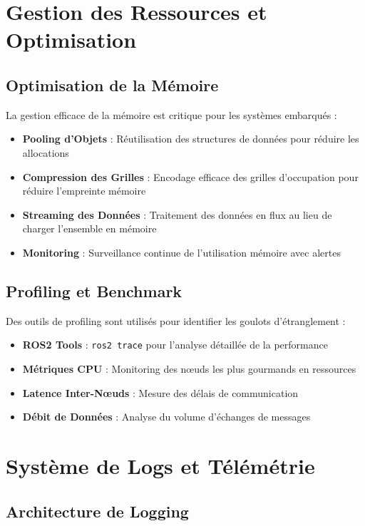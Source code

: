 \documentclass[12pt,a4paper,oneside]{report}
\begin{document}
\section{Gestion des Ressources et Optimisation}

\subsection{Optimisation de la Mémoire}

La gestion efficace de la mémoire est critique pour les systèmes embarqués :

\begin{itemize}
  \item \textbf{Pooling d'Objets} : Réutilisation des structures de données pour réduire les allocations
  \item \textbf{Compression des Grilles} : Encodage efficace des grilles d'occupation pour réduire l'empreinte mémoire
  \item \textbf{Streaming des Données} : Traitement des données en flux au lieu de charger l'ensemble en mémoire
  \item \textbf{Monitoring} : Surveillance continue de l'utilisation mémoire avec alertes
\end{itemize}

\subsection{Profiling et Benchmark}

Des outils de profiling sont utilisés pour identifier les goulots d'étranglement :

\begin{itemize}
  \item \textbf{ROS2 Tools} : \texttt{ros2 trace} pour l'analyse détaillée de la performance
  \item \textbf{Métriques CPU} : Monitoring des nœuds les plus gourmands en ressources
  \item \textbf{Latence Inter-Nœuds} : Mesure des délais de communication
  \item \textbf{Débit de Données} : Analyse du volume d'échanges de messages
\end{itemize}

\section{Système de Logs et Télémétrie}

\subsection{Architecture de Logging}
\end{document}
